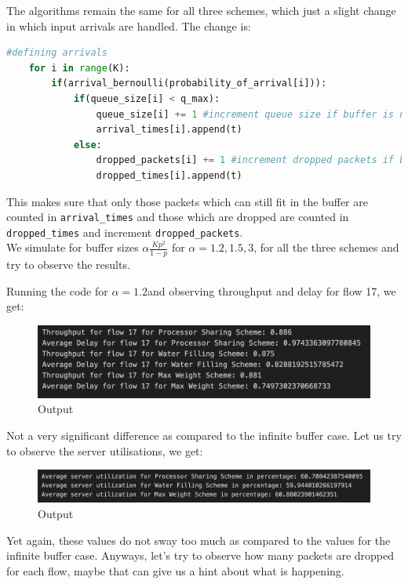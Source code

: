 \documentclass[11pt, a4paper]{article}
\begin{document}
The algorithms remain the same for all three schemes, which just a slight change in which input arrivals are handled. The change is:

\begin{lstlisting}[language=Python]
#defining arrivals
    for i in range(K):
        if(arrival_bernoulli(probability_of_arrival[i])):
            if(queue_size[i] < q_max):
                queue_size[i] += 1 #increment queue size if buffer is not full
                arrival_times[i].append(t)
            else:
                dropped_packets[i] += 1 #increment dropped packets if buffer is full
                dropped_times[i].append(t)
\end{lstlisting}

This makes sure that only those packets which can still fit in the buffer are counted in \texttt{arrival{\_}times} and those which are dropped are counted in \texttt{dropped{\_}times} and increment \texttt{dropped{\_}packets}. \\

We simulate for buffer sizes $\alpha \frac{Kp^2}{1-p}$ for $\alpha = 1.2, 1.5, 3$, for all the three schemes and try to observe the results.

Running the code for $\alpha = 1.2$and observing throughput and delay for flow 17, we get:


\begin{figure}[H]
     \centering
     \includegraphics[scale=0.2]{fig_a.png}
     \caption{Output}
\end{figure}

Not a very significant difference as compared to the infinite buffer case. Let us try to observe the server utilisations, we get:

\begin{figure}[H]
     \centering
     \includegraphics[scale=0.2]{fig_b.png}
     \caption{Output}
\end{figure}

Yet again, these values do not sway too much as compared to the values for the infinite buffer case. Anyways, let's try to observe how many packets are dropped for each flow, maybe that can give us a hint about what is happening.
\end{document}
